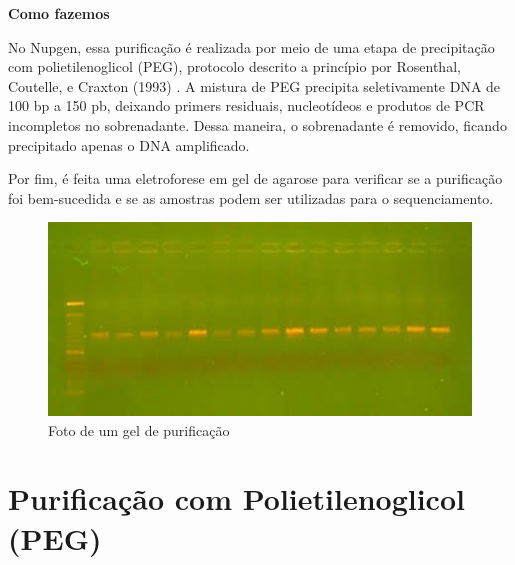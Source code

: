 \documentclass[
  letterpaper,
  DIV=11,
  numbers=noendperiod]{scrreprt}
\begin{document}
\begin{tcolorbox}[enhanced jigsaw, colback=white, toprule=.15mm, rightrule=.15mm, opacityback=0, left=2mm, arc=.35mm, bottomrule=.15mm, breakable, leftrule=.75mm]
\begin{minipage}[t]{5.5mm}
\textcolor{quarto-callout-note-color}{\faInfo}
\end{minipage}%
\begin{minipage}[t]{\textwidth - 5.5mm}

\textbf{Como fazemos}\vspace{2mm}

No Nupgen, essa purificação é realizada por meio de uma etapa de
precipitação com polietilenoglicol (PEG), protocolo descrito a princípio
por Rosenthal, Coutelle, e Craxton (1993) . A mistura de PEG precipita
seletivamente DNA de 100 bp a 150 pb, deixando primers residuais,
nucleotídeos e produtos de PCR incompletos no sobrenadante. Dessa
maneira, o sobrenadante é removido, ficando precipitado apenas o DNA
amplificado.

\end{minipage}%
\end{tcolorbox}

Por fim, é feita uma eletroforese em gel de agarose para verificar se a
purificação foi bem-sucedida e se as amostras podem ser utilizadas para
o sequenciamento.

\begin{figure}

{\centering \includegraphics{gel_purificacao.jpg}

}

\caption{Foto de um gel de purificação}

\end{figure}

\hypertarget{purificauxe7uxe3o-com-polietilenoglicol-peg}{%
\section{Purificação com Polietilenoglicol
(PEG)}\label{purificauxe7uxe3o-com-polietilenoglicol-peg}}
\end{document}
